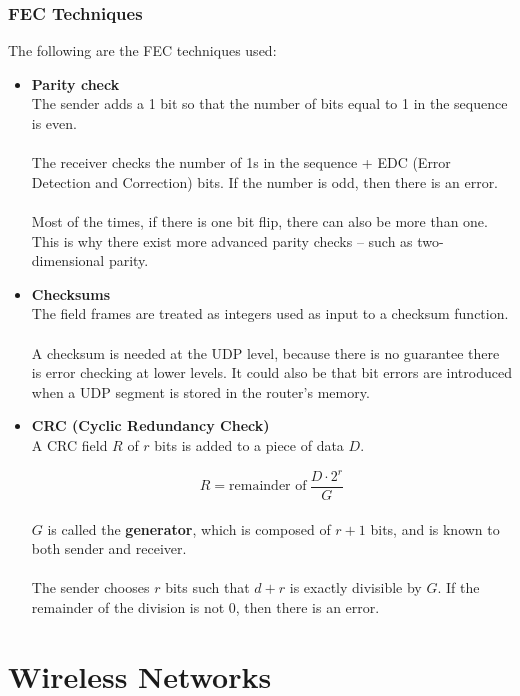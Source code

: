 \documentclass{article}
\begin{document}
\subsubsection{FEC Techniques}
The following are the FEC techniques used:

\begin{itemize}
	\item \textbf{Parity check}
	\vspace{.2cm} \\
	The sender adds a 1 bit so that the number of bits equal to 1 in the sequence is even. \\ \\
	The receiver checks the number of 1s in the sequence + EDC (Error Detection and Correction) bits. If the number is odd, then there is an error. \\ \\
	Most of the times, if there is one bit flip, there can also be more than one. This is why there exist more advanced parity checks -- such as two-dimensional parity.
	
	\item \textbf{Checksums}
	\vspace{.2cm} \\
	The field frames are treated as integers used as input to a checksum function. \\ \\
	A checksum is needed at the UDP level, because there is no guarantee there is error checking at lower levels. It could also be that bit errors are introduced when a UDP segment is stored in the router's memory.
	
	\item \textbf{CRC (Cyclic Redundancy Check)}
	\vspace{.2cm} \\
	A CRC field $R$ of $r$ bits is added to a piece of data $D$.
	
	\[ R = \text{remainder of}~ \frac{D \cdot 2^r}{G} \] \\
	$G$ is called the \textbf{generator}, which is composed of $r+1$ bits, and is known to both sender and receiver. \\ \\
	The sender chooses $r$ bits such that $d+r$ is exactly divisible by $G$. If the remainder of the division is not 0, then there is an error.
\end{itemize}

\section{Wireless Networks}
\end{document}
